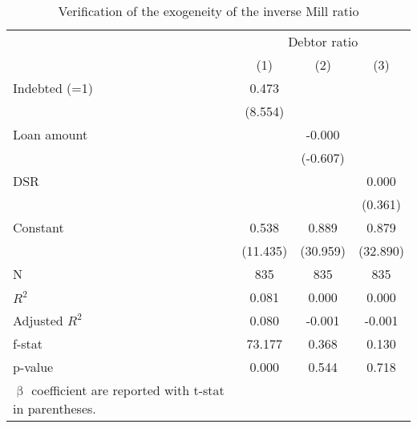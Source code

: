 \begin{table}[htbp]
  \raggedright
  \caption{Verification of the exogeneity of the inverse Mill ratio }
    \begin{tabular}{lccc}
    \toprule
          & \multicolumn{3}{c}{Debtor ratio} \\
\cmidrule{2-4}          & (1)   & (2)   & (3) \\
    \midrule
    Indebted (=1) & 0.473 &       &  \\
          & (8.554) &       &  \\
    Loan amount &       & -0.000 &  \\
          &       & (-0.607) &  \\
    DSR   &       &       & 0.000 \\
          &       &       & (0.361) \\
    Constant & 0.538 & 0.889 & 0.879 \\
          & (11.435) & (30.959) & (32.890) \\
    \midrule
    N     & 835   & 835   & 835 \\
    $R^2$    & 0.081 & 0.000 & 0.000 \\
    Adjusted $R^2$ & 0.080 & -0.001 & -0.001 \\
    f-stat     & 73.177 & 0.368 & 0.130 \\
    p-value & 0.000 & 0.544 & 0.718 \\
    \bottomrule
	\Tablenote{4}{$\upbeta$ coefficient are reported with t-stat in \\ parentheses.} \\			
    \end{tabular}%
  \label{tab:imrcheck}%
\end{table}%
